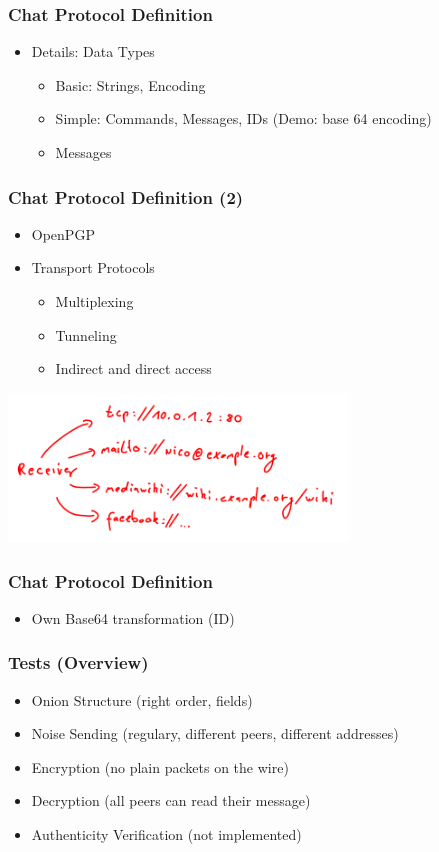 \documentclass{beamer}
\begin{document}
\frame
{
  \frametitle{Chat Protocol Definition}
  \begin{itemize}
      \item Details: Data Types 
      \begin{itemize}
          \item Basic: Strings, Encoding
          \item Simple: Commands, Messages, IDs \pause (Demo: base 64 encoding)
          \pause \item Messages
      \end{itemize}
   \end{itemize}
}

\frame
{
  \frametitle{Chat Protocol Definition (2)}
  \begin{itemize}
      \item OpenPGP
      \item Transport Protocols
      \begin{itemize}
          \item Multiplexing
          \item Tunneling
          \item Indirect and direct access
       \end{itemize}
   \end{itemize}
  \begin{center}
   \includegraphics[width=9cm]{../addressmultiplexing.png}
  \end{center}
}

\frame
{
  \frametitle{Chat Protocol Definition}
  \begin{itemize}
    \item Own Base64 transformation (ID)
   \end{itemize}
}

\frame
{
  \frametitle{Tests (Overview)}
  \begin{itemize}
          \item Onion Structure (right order, fields)
          \item Noise Sending (regulary, different peers, different addresses)
          \item Encryption (no plain packets on the wire)
          \item Decryption (all peers can read their message)
          \item Authenticity Verification (\alert{not implemented})
   \end{itemize}
}
\end{document}
